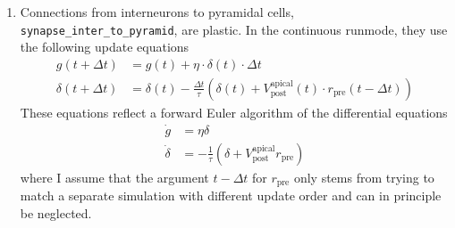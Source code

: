 \documentclass{article}
\begin{document}
\begin{enumerate}
 \item
   Connections from interneurons to pyramidal cells,
   \verb+synapse_inter_to_pyramid+, are plastic. In the continuous
   runmode, they use the following update equations
   \begin{align}
     g(t+\Delta t) &= g(t) + \eta \cdot \delta(t) \cdot \Delta t \\
     \delta(t+\Delta t) &= \delta(t) - \frac{\Delta t}{\tau} (\delta(t)
     + V_{\text{post}}^{\text{apical}}(t) \cdot r_{\text{pre}}(t-\Delta
     t))
   \end{align}
   These equations reflect a forward Euler algorithm of the
   differential equations
   \begin{align}
     \dot{g} &= \eta \delta \label{eqn:l1}\\
     \dot{\delta} &= -\frac{1}{\tau} (\delta + 
     V_{\text{post}}^{\text{apical}} r_{\text{pre}}) \label{eqn:l2}
   \end{align}
   where I assume that the argument $t- \Delta t$ for $r_{\text{pre}}$
   only stems from trying to match a separate simulation with
   different update order and can in principle be neglected.
   

\end{enumerate}
\end{document}
